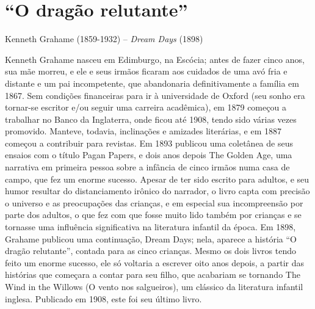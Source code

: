 \section{“O dragão relutante”} 

Kenneth Grahame (1859-1932) -- \textit{Dream Days} (1898)

Kenneth Grahame nasceu em Edimburgo, na Escócia; antes de fazer cinco
anos, sua mãe morreu, e ele e seus irmãos ficaram aos cuidados de uma
avó fria e distante e um pai incompetente, que abandonaria
definitivamente a família em 1867. Sem condições financeiras para ir
à universidade de Oxford (seu sonho era tornar-se escritor e/ou
seguir uma carreira acadêmica), em 1879 começou a trabalhar no Banco
da Inglaterra, onde ficou até 1908, tendo sido várias vezes
promovido. Manteve, todavia, inclinações e amizades literárias, e em
1887 começou a contribuir para revistas. Em 1893 publicou uma
coletânea de seus ensaios com o título Pagan Papers, e dois anos
depois The Golden Age, uma narrativa em primeira pessoa sobre a
infância de cinco irmãos numa casa de campo, que fez um enorme
sucesso. Apesar de ter sido escrito para adultos, e seu humor
resultar do distanciamento irônico do narrador, o livro capta com
precisão o universo e as preocupações das crianças, e em especial sua
incompreensão por parte dos adultos, o que fez com que fosse muito
lido também por crianças e se tornasse uma influência significativa
na literatura infantil da época. Em 1898, Grahame publicou uma
continuação, Dream Days; nela, aparece a história “O dragão
relutante”, contada para as cinco crianças. Mesmo os dois livros
tendo feito um enorme sucesso, ele só voltaria a escrever oito anos
depois, a partir das histórias que começara a contar para seu filho,
que acabariam se tornando The Wind in the Willows (O vento nos
salgueiros), um clássico da literatura infantil inglesa. Publicado em
1908, este foi seu último livro.

